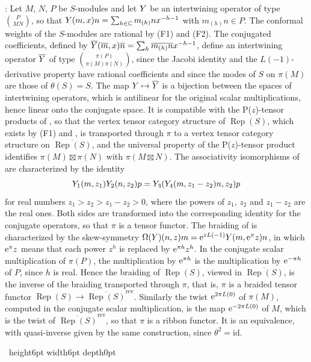 \documentclass[leqno]{article}
\newcommand{\Cbb}{\ensuremath{\mathbb{C}}}
\let\cal\relax
\newcommand{\cal}{\mathcal}
\newcommand{\qed}{\hfill \vrule height6pt  width6pt depth0pt}
\newcommand{\ovl}{\overline}
\let\i\relax
\newcommand{\i}{\mathrm{i}}
\newcommand{\e}{\mathrm{e}}
\DeclareMathOperator{\Rep}{Rep}
\newenvironment{proof}[1][]{\noindent {\it Proof #1} : }{\hbox{~}\qed
\smallskip
}
\numberwithin{equation}{section}
\begin{document}
\begin{proof}
Let $M$, $N$, $P$ be $S$-modules and let $\cal Y$ be an intertwining operator of type $\binom{P}{M N}$, so that $\cal Y(m,x)n = \sum_{h \in \Cbb} m_{(h)}n x^{-h-1}$ with $m_{(h)}n \in P$. The conformal weights of the $S$-modules are rational by (F1) and (F2). The conjugated coefficients, defined by $\overline{\cal Y}(\overline m,x)\overline n = \sum_h \overline{m_{(h)}n}x^{-h-1}$, define an intertwining operator $\ovl{\cal Y}$ of type $\binom{\pi(P)}{\pi(M) \pi(N)}$, since the Jacobi identity and the $L(-1)$-derivative property have rational coefficients and since the modes of $S$ on $\pi(M)$ are those of $\theta(S) = S$. The map $\cal Y \mapsto \ovl{\cal Y}$ is a bijection between the spaces of intertwining operators, which is antilinear for the original scalar multiplications, hence linear onto the conjugate space. It is compatible with the P($z$)-tensor products of \cite{HL95,Hua05}, so that the vertex tensor category structure of $\Rep(S)$, which exists by (F1) and \cite[Theorem 4.6]{Hua08}, is transported through $\pi$ to a vertex tensor category structure on $\ovl{\Rep(S)}$, and the universal property of the P($z$)-tensor product identifies $\pi(M) \boxtimes \pi(N)$ with $\pi(M \boxtimes N)$. The associativity isomorphisms of \cite{Hua05} are characterized by the identity
\[
\cal Y_1(m,z_1)\cal Y_2(n,z_2)p = \cal Y_3(\cal Y_4(m,z_1-z_2)n,z_2)p
\]
for real numbers $z_1 > z_2 > z_1-z_2 > 0$, where the powers of $z_1$, $z_2$ and $z_1-z_2$ are the real ones. Both sides are transformed into the corresponding identity for the conjugate operators, so that $\pi$ is a tensor functor. The braiding of \cite{Hua08} is characterized by the skew-symmetry $\Omega(\cal Y)(n,z)m = \e^{zL(-1)}\cal Y(m,\e^{\pi\i}z)n$, in which $\e^{\pi\i}z$ means that each power $z^{h}$ is replaced by $\e^{\pi\i h}z^h$. In the conjugate scalar multiplication of $\pi(P)$, the multiplication by $\e^{\pi\i h}$ is the multiplication by $\e^{-\pi\i h}$ of $P$, since $h$ is real. Hence the braiding of $\Rep(S)$, viewed in $\ovl{\Rep(S)}$, is the inverse of the braiding transported through $\pi$, that is, $\pi$ is a braided tensor functor $\Rep(S) \to \ovl{\Rep(S)}^{\mathrm{rev}}$. Similarly the twist $\e^{2\pi\i L(0)}$ of $\pi(M)$, computed in the conjugate scalar multiplication, is the map $\e^{-2\pi\i L(0)}$ of $M$, which is the twist of $\ovl{\Rep(S)}^{\mathrm{rev}}$, so that $\pi$ is a ribbon functor. It is an equivalence, with quasi-inverse given by the same construction, since $\theta^2 = \mathrm{id}$.


\end{proof}
\end{document}
